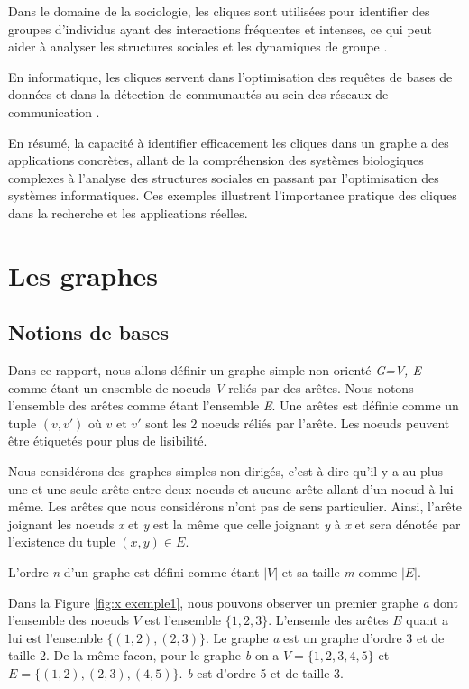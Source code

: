 \documentclass[12pt,a4paper]{article}
\begin{document}
Dans le domaine de la sociologie, les cliques sont utilisées pour identifier des groupes d'individus ayant des interactions fréquentes et intenses, ce qui peut aider à analyser les structures sociales et les dynamiques de groupe \cite{SCOTT201129}.

En informatique, les cliques servent dans l'optimisation des requêtes de bases de données et dans la détection de communautés au sein des réseaux de communication \cite{CORMEN200932}.

En résumé, la capacité à identifier efficacement les cliques dans un graphe a des applications concrètes, allant de la compréhension des systèmes biologiques complexes à l'analyse des structures sociales en passant par l'optimisation des systèmes informatiques. Ces exemples illustrent l'importance pratique des cliques dans la recherche et les applications réelles\cite{FORTUNATO201075}.

\section{Les graphes}%
\label{sec:graphes}

\subsection{Notions de bases}

Dans ce rapport, nous allons définir un graphe simple non orienté \emph{G=V, E} comme étant un ensemble de noeuds \emph{V} reliés par des arêtes. Nous notons l'ensemble des arêtes comme étant l'ensemble \emph{E}. Une arêtes est définie comme un tuple $ (v, v') $ où $ v $ et $ v' $ sont les 2 noeuds réliés par l'arête. Les noeuds peuvent être étiquetés pour plus de lisibilité.


Nous considérons des graphes simples non dirigés, c'est à dire qu'il y a au plus une et une seule arête entre deux noeuds et aucune arête allant d'un noeud à lui-même. Les arêtes que nous considérons n'ont pas de sens particulier. Ainsi, l'arête joignant les noeuds \emph{x} et \emph{y} est la même que celle joignant \emph{y} à \emph{x} et sera dénotée par l'existence du tuple $(x, y) \in E$.

L'ordre \emph{n} d'un graphe est défini comme étant $ |V| $ et sa taille \emph{m} comme $ |E| $.

Dans la Figure \ref{fig:x exemple1}, nous pouvons observer un premier graphe \textit{a} dont l'ensemble des noeuds \(V\) est l'ensemble \(\{1, 2, 3\}\). L'ensemle des arêtes \(E\) quant a lui est l'ensemble \(\{(1,2), (2,3)\}\). Le graphe \textit{a} est un graphe d'ordre 3 et de taille 2. De la même facon, pour le graphe \textit{b} on a \(V = \{1, 2, 3, 4, 5\}\) et \(E = \{(1,2), (2,3), (4,5)\}\). \textit{b} est d'ordre 5 et de taille 3.
\end{document}
